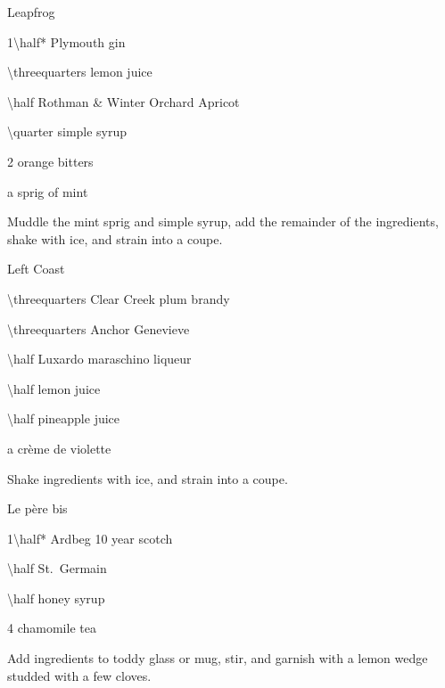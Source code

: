\begin{PDTCocktail}{Leapfrog}
	\begin{Ingredients}
	\item \SI{1\half*}{\oz} Plymouth gin
	\item \SI{\threequarters}{\oz} lemon juice
	\item \SI{\half}{\oz} Rothman \& Winter Orchard Apricot
	\item \SI{\quarter}{\oz} simple syrup
	\item 2 \si{\dashes} orange bitters
	\item a sprig of mint
	\end{Ingredients}
	
	\begin{Instructions}
	Muddle the mint sprig and simple syrup, add the remainder of the ingredients, shake with ice, and strain into a coupe.
	\end{Instructions}
\end{PDTCocktail}

\begin{PDTCocktail}{Left Coast}
	\begin{Ingredients}
	\item \SI{\threequarters}{\oz} Clear Creek plum brandy
	\item \SI{\threequarters}{\oz} Anchor Genevieve
	\item \SI{\half}{\oz} Luxardo maraschino liqueur
	\item \SI{\half}{\oz} lemon juice
	\item \SI{\half}{\oz} pineapple juice
	\item a \si{\dash} cr\`eme de violette
	\end{Ingredients}
	
	\begin{Instructions}
	Shake ingredients with ice, and strain into a coupe.
	\end{Instructions}
\end{PDTCocktail}

\begin{PDTCocktail}{Le p\`ere bis}
	\begin{Ingredients}
	\item \SI{1\half*}{\oz} Ardbeg 10 year scotch
	\item \SI{\half}{\oz} St.\ Germain
	\item \SI{\half}{\oz} honey syrup
	\item \SI{4}{\oz} chamomile tea
	\end{Ingredients}
	
	\begin{Instructions}
	Add ingredients to toddy glass or mug, stir, and garnish with a lemon wedge studded with a few cloves.
	\end{Instructions}
\end{PDTCocktail}

